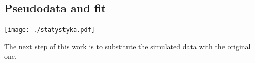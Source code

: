 \documentclass[a1,portrait]{a0poster}
\begin{document}
\begin{multicols}{2}
\subsection*{Pseudodata and fit}

\begin{center}
  \texttt{[image: ./statystyka.pdf]}
\end{center}

The next step of this work is to substitute the simulated data with the original one.






\end{multicols}
\end{document}
